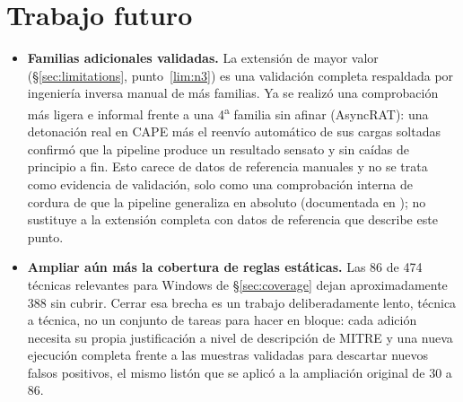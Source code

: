 \section{Trabajo futuro}
\label{sec:future-work}

\begin{itemize}

\item \textbf{Familias adicionales validadas.} La extensi\'on de mayor
  valor (\S\ref{sec:limitations}, punto~\ref{lim:n3}) es una validaci\'on
  completa respaldada por ingenier\'ia inversa manual de m\'as
  familias. Ya se realiz\'o una comprobaci\'on m\'as ligera e informal
  frente a una 4\textsuperscript{a} familia sin afinar (AsyncRAT): una
  detonaci\'on real en CAPE m\'as el reenv\'io autom\'atico de sus
  cargas soltadas confirm\'o que la pipeline produce un resultado
  sensato y sin ca\'idas de principio a fin. Esto carece de datos de
  referencia manuales y no se trata como evidencia de validaci\'on, solo
  como una comprobaci\'on interna de cordura de que la pipeline
  generaliza en absoluto (documentada en ); no
  sustituye a la extensi\'on completa con datos de referencia que
  describe este punto.

\item \textbf{Ampliar a\'un m\'as la cobertura de reglas est\'aticas.}
  Las 86 de 474 t\'ecnicas relevantes para Windows de
  \S\ref{sec:coverage} dejan aproximadamente 388 sin cubrir. Cerrar esa
  brecha es un trabajo deliberadamente lento, t\'ecnica a t\'ecnica, no
  un conjunto de tareas para hacer en bloque: cada adici\'on necesita
  su propia justificaci\'on a nivel de descripci\'on de MITRE y una
  nueva ejecuci\'on completa frente a las muestras validadas para
  descartar nuevos falsos positivos, el mismo list\'on que se aplic\'o
  a la ampliaci\'on original de 30 a 86.


\end{itemize}
